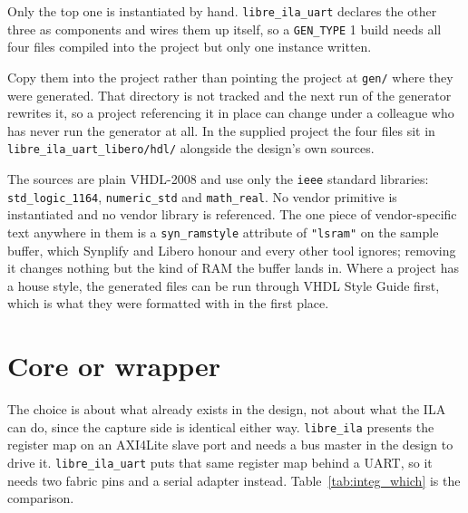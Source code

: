 \documentclass[../manual.tex]{subfiles}
\begin{document}
Only the top one is instantiated by hand. \texttt{libre\_ila\_uart} declares the other three as components and wires them up itself, so a \texttt{GEN\_TYPE} 1 build needs all four files compiled into the project but only one instance written.

Copy them into the project rather than pointing the project at \texttt{gen/} where they were generated. That directory is not tracked and the next run of the generator rewrites it, so a project referencing it in place can change under a colleague who has never run the generator at all. In the supplied project the four files sit in \texttt{libre\_ila\_uart\_libero/hdl/} alongside the design's own sources.

The sources are plain VHDL-2008 and use only the \texttt{ieee} standard libraries: \texttt{std\_logic\_1164}, \texttt{numeric\_std} and \texttt{math\_real}. No vendor primitive is instantiated and no vendor library is referenced. The one piece of vendor-specific text anywhere in them is a \texttt{syn\_ramstyle} attribute of \texttt{"lsram"} on the sample buffer, which Synplify and Libero honour and every other tool ignores; removing it changes nothing but the kind of RAM the buffer lands in. Where a project has a house style, the generated files can be run through VHDL Style Guide first, which is what they were formatted with in the first place.

\section{Core or wrapper}
\label{sec:integ_which}

The choice is about what already exists in the design, not about what the ILA can do, since the capture side is identical either way. \texttt{libre\_ila} presents the register map on an AXI4Lite slave port and needs a bus master in the design to drive it. \texttt{libre\_ila\_uart} puts that same register map behind a UART, so it needs two fabric pins and a serial adapter instead. Table~\ref{tab:integ_which} is the comparison.
\end{document}
